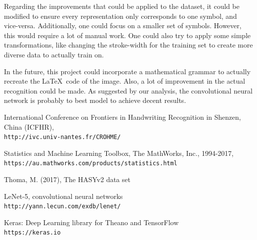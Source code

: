 \documentclass[twocolumn]{article}%
\begin{document}
	Regarding the improvements that could be applied to the dataset, it could be modified to ensure every representation only corresponds to one symbol, and vice-versa. Additionally, one could focus on a smaller set of symbols. However, this would require a lot of manual work. One could also try to apply some simple transformations, like changing the stroke-width for the training set to create more diverse data to actually train on.
	
	In the future, this project could incorporate a mathematical grammar to actually recreate the \LaTeX \ code of the image. Also, a lot of improvement in the actual recognition could be made. As suggested by our analysis, the convolutional neural network is probably to best model to achieve decent results.
	
	\begin{thebibliography}{9}
		International Conference on Frontiers in Handwriting Recognition in Shenzen, China (ICFHR),
		\\\texttt{http://ivc.univ-nantes.fr/CROHME/}
		
		Statistics and Machine Learning Toolbox, The MathWorks, Inc., 1994-2017,
		\\\texttt{https://au.mathworks.com/products/statistics.html}
		
		Thoma, M. (2017), The HASYv2 data set
		
		LeNet-5, convolutional neural networks
		\\\texttt{http://yann.lecun.com/exdb/lenet/}
		
		Keras: Deep Learning library for Theano and TensorFlow
		\\\texttt{https://keras.io}
		
		
	\end{thebibliography}
\end{document}
